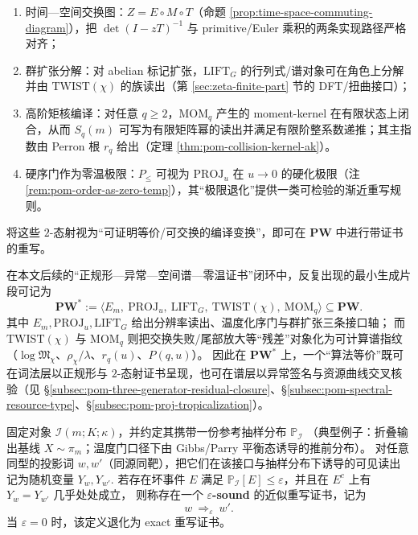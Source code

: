 \begin{definition}
\begin{itemize}
\begin{enumerate}
    \item 时间—空间交换图：$Z=E\circ M\circ T$（命题 \ref{prop:time-space-commuting-diagram}），把 $\det(I-zT)^{-1}$ 与 primitive/Euler 乘积的两条实现路径严格对齐；
    \item 群扩张分解：对 abelian 标记扩张，$\mathrm{LIFT}_G$ 的行列式/谱对象可在角色上分解并由 $\mathrm{TWIST}(\chi)$ 的族读出（第 \ref{sec:zeta-finite-part} 节的 DFT/扭曲接口）；
    \item 高阶矩核编译：对任意 \(q\ge2\)，$\mathrm{MOM}_q$ 产生的 moment-kernel 在有限状态上闭合，从而 \(S_q(m)\) 可写为有限矩阵幂的读出并满足有限阶整系数递推；其主指数由 Perron 根 \(r_q\) 给出（定理 \ref{thm:pom-collision-kernel-ak}）。
    \item 硬序门作为零温极限：$P_{\le}$ 可视为 $\mathrm{PROJ}_u$ 在 $u\to 0$ 的硬化极限（注 \ref{rem:pom-order-as-zero-temp}），其“极限退化”提供一类可检验的渐近重写规则。
  \end{enumerate}
\end{itemize}
将这些 $2$-态射视为“可证明等价/可交换的编译变换”，即可在 $\mathbf{PW}$ 中进行带证书的重写。
\end{definition}

\begin{remark}\label{rem:pom-pw-star-fragment}
在本文后续的“正规形—异常—空间谱—零温证书”闭环中，反复出现的最小生成片段可记为
\[
\mathbf{PW}^{\ast}:=\langle E_m,\ \mathrm{PROJ}_u,\ \mathrm{LIFT}_G,\ \mathrm{TWIST}(\chi),\ \mathrm{MOM}_q\rangle\subseteq \mathbf{PW}.
\]
其中 \(E_m,\mathrm{PROJ}_u,\mathrm{LIFT}_G\) 给出分辨率读出、温度化序门与群扩张三条接口轴；
而 \(\mathrm{TWIST}(\chi)\) 与 \(\mathrm{MOM}_q\) 则把交换失败/尾部放大等“残差”对象化为可计算谱指纹（\(\log\mathfrak{M}_\chi\)、\(\rho_\chi/\lambda\)、\(r_q(u)\)、\(P(q,u)\)）。
因此在 \(\mathbf{PW}^{\ast}\) 上，一个“算法等价”既可在词法层以正规形与 \(2\)-态射证书呈现，也可在谱层以异常签名与资源曲线交叉核验（见 \S\ref{subsec:pom-three-generator-residual-closure}、\S\ref{subsec:pom-spectral-resource-type}、\S\ref{subsec:pom-proj-tropicalization}）。
\end{remark}

\begin{definition}\label{def:pom-eps-sound-rewrite}
固定对象 \(\mathcal{I}(m;K;\kappa)\)，并约定其携带一份参考抽样分布 \(\mathbb{P}_{\mathcal I}\)
（典型例子：折叠输出基线 \(X\sim\pi_m\)；温度门口径下由 Gibbs/Parry 平衡态诱导的推前分布）。
对任意同型的投影词 \(w,w'\)（同源同靶），把它们在该接口与抽样分布下诱导的可见读出记为随机变量
\(
Y_w,Y_{w'}.
\)
若存在坏事件 \(E\) 满足 \(\mathbb{P}_{\mathcal I}[E]\le \varepsilon\)，并且在 \(E^c\) 上有 \(Y_w=Y_{w'}\) 几乎处处成立，
则称存在一个 \textbf{\(\varepsilon\)-sound} 的近似重写证书，记为
$$
w\ \Longrightarrow_{\varepsilon}\ w'.
$$
当 \(\varepsilon=0\) 时，该定义退化为 exact 重写证书。
\end{definition}

